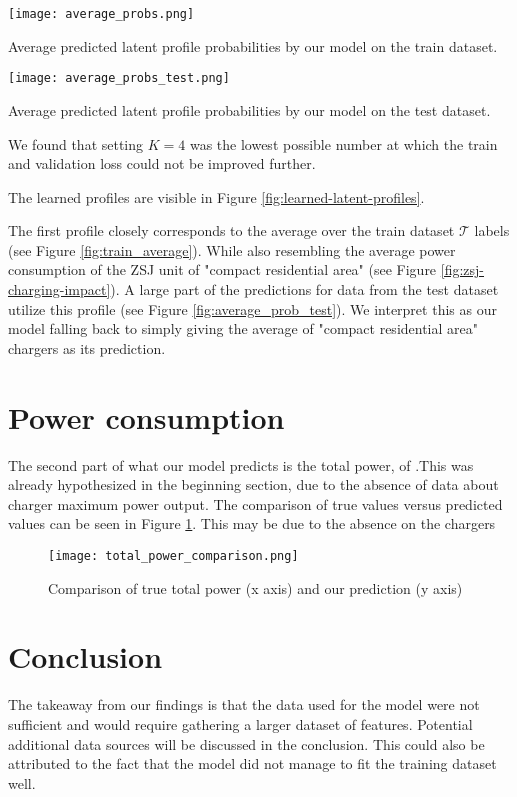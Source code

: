 \begin{marginfigure}
    \texttt{[image: average\_probs.png]}
    \caption{Average predicted latent profile probabilities by our model on the train dataset.}
    \label{fig:average_prob}
\end{marginfigure}

\begin{marginfigure}
    \texttt{[image: average\_probs\_test.png]}
    \caption{Average predicted latent profile probabilities by our model on the test dataset.}
    \label{fig:average_prob_test}
\end{marginfigure}

We found that setting $K=4$ was the lowest possible number at which the train and validation loss could not be improved further.

The learned profiles are visible in Figure \ref{fig:learned-latent-profiles}.

The first profile closely corresponds to the average over the train dataset $\mathcal{T}$ labels (see Figure \ref{fig:train_average}). While also resembling the average power consumption of the ZSJ unit of "compact residential area" (see Figure \ref{fig:zsj-charging-impact}). A large part of the predictions for data from the test dataset utilize this profile (see Figure \ref{fig:average_prob_test}). We interpret this as our model falling back to simply giving the average of "compact residential area" chargers as its prediction.

\section{Power consumption}

The second part of what our model predicts is the total power, of .This was already hypothesized in the beginning section, due to the absence of data about charger maximum power output. The comparison of true values versus predicted values can be seen in Figure \ref{fig:total-power-comparison}. This may be due to the absence on the chargers

\begin{figure}[h!]
    \texttt{[image: total\_power\_comparison.png]}
    \caption{Comparison of true total power (x axis) and our prediction (y axis)}
    \label{fig:total-power-comparison}
\end{figure}

\section{Conclusion}

The takeaway from our findings is that the data used for the model were not sufficient and would require gathering a larger dataset of features. Potential additional data sources will be discussed in the conclusion. This could also be attributed to the fact that the model did not manage to fit the training dataset well.
